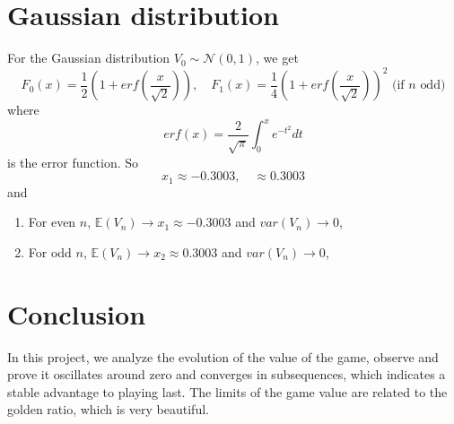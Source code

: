 \documentclass[a4paper,english]{article}
\newcommand{\pth}[1]{\left( #1 \right)}
\begin{document}
\begin{spacing}{1.4}
\section{Gaussian distribution}
For the Gaussian distribution $V_0 \sim \mathcal{N}(0, 1)$, we get
\begin{equation*}
  F_0(x) = \frac 12 \pth{1+erf(\frac{x}{\sqrt{2}})}, \quad F_1(x) = \frac 14 \pth{1+erf(\frac{x}{\sqrt{2}})}^2 \text{ (if $n$ odd)}
\end{equation*}
where
\begin{equation*}
  erf(x) = \frac{2}{\sqrt{\pi}} \int_0^x e^{-t^2} dt
\end{equation*}
is the error function. So
\begin{equation}
  x_1 \approx -0.3003, \quad \approx 0.3003
\end{equation}
and
\begin{enumerate}
  \item For even $n$, $\mathbb{E} (V_n) \to x_1\approx -0.3003$ and $var(V_n) \to 0$,
  \item For odd $n$, $\mathbb{E} (V_n) \to x_2 \approx 0.3003$ and $var(V_n) \to 0$,
\end{enumerate}

\section{Conclusion}
In this project, we analyze the evolution of the value of the game, observe and prove it oscillates around zero and converges in subsequences, which indicates a stable advantage to playing last. The limits of the game value are related to the golden ratio, which is very beautiful.

\vspace{5em}









\end{spacing}
\end{document}
